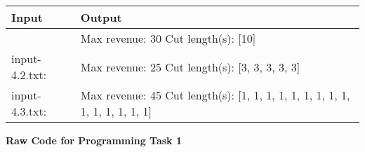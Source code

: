 \documentclass[11pt]{article}
\begin{document}
\begin{center}
\begin{tabular}{|p{10em}|p{30em}|} 
\hline
\textbf{Input} & \textbf{Output} \\ 
\hline
[1, 5, 8, 9, 10, 17, 17, 20, 24, 30] & Max revenue: 30 \newline Cut length(s): [10] \\ 
\hline 
input-4.2.txt: \newline [1, 3, 5, 5, 7, 7, 9, 9, 11, 11, 11, 11, 11, 11, 11] & Max revenue: 25
 \newline Cut length(s): [3, 3, 3, 3, 3] \\
\hline 
input-4.3.txt: \newline [3, 4, 4, 4, 4, 4, 4, 4, 4, 4, 4, 4, 4, 4, 4] & Max revenue: 45 \newline Cut length(s): [1, 1, 1, 1, 1, 1, 1, 1, 1, 1, 1, 1, 1, 1, 1] \\ 
\hline
\end{tabular}
\end{center}


\pagebreak
\textbf{Raw Code for Programming Task 1}

\lstset{
    basicstyle=\ttfamily\footnotesize,
    breaklines=true,  %
    frame=single,     %
    numbers=left,     %
    tabsize=4,        %
    showstringspaces=false %
}
\end{document}
